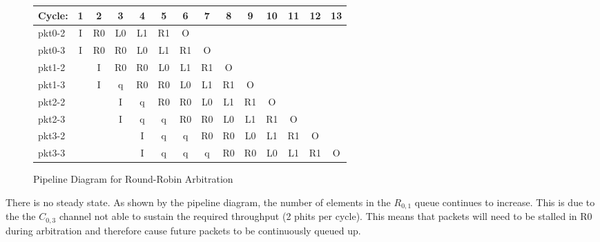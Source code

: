 \documentclass[10pt]{article}
\begin{document}
\begin{figure}[H]
\centering
{\setlength{\tabcolsep}{2pt}
\begin{tabular}{|l|c|c|c|c|c|c|c|c|c|c|c|c|c|}
\hline
Cycle: & 1  & 2  & 3  & 4  & 5  & 6  & 7  & 8  & 9  & 10 & 11 & 12 & 13 \\ \hline
pkt0-2 & I  & R0 & L0 & L1 & R1 & O  &    &    &    &    &    &    &    \\ \hline
pkt0-3 & I  & R0 & R0 & L0 & L1 & R1 & O  &    &    &    &    &    &    \\ \hline
pkt1-2 &    & I  & R0 & R0 & L0 & L1 & R1 & O  &    &    &    &    &    \\ \hline
pkt1-3 &    & I  & q  & R0 & R0 & L0 & L1 & R1 & O  &    &    &    &    \\ \hline
pkt2-2 &    &    & I  & q  & R0 & R0 & L0 & L1 & R1 & O  &    &    &    \\ \hline
pkt2-3 &    &    & I  & q  & q  & R0 & R0 & L0 & L1 & R1 & O  &    &    \\ \hline
pkt3-2 &    &    &    & I  & q  & q  & R0 & R0 & L0 & L1 & R1 & O  &    \\ \hline
pkt3-3 &    &    &    & I  & q  & q  & q  & R0 & R0 & L0 & L1 & R1 & O  \\ \hline
\end{tabular}
}
\caption{Pipeline Diagram for Round-Robin Arbitration}
\end{figure}
There is no steady state. As shown by the pipeline diagram, the number of elements in the $R_{0,1}$ queue continues to increase. This is due to the the $C_{0,3}$ channel not able to sustain the required throughput (2 phits per cycle). This means that packets will need to be stalled in R0 during arbitration and therefore cause future packets to be continuously queued up. 
\end{document}
